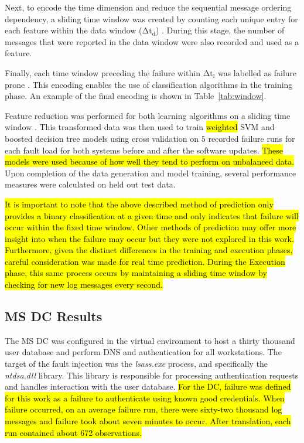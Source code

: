 Next, to encode the time dimension and reduce the sequential message ordering
dependency, a sliding time window was created by counting each unique entry for
each feature within the data window ($\mathrm{\Delta t_d}$)
\citep{vaarandi2002}.  During this stage, the number of messages that were
reported in the data window were also recorded and used as a feature.

Finally, each time window preceding the failure within $\mathrm{\Delta t_l}$
was labelled as failure prone \citep{irrera2015}.  This encoding enables the
use of classification algorithms in the training phase.  An example of the
final encoding is shown in Table~\ref{tab:window}.

\tabMessageIDs %
\tabSlidingWindow

Feature reduction was performed for both learning algorithms on a sliding time
window \citep{fulp2008,irrera2013a,vaarandi2002}.  This transformed data was
then used to train \hl{weighted} \ac{SVM} and boosted decision tree models
using cross validation on $5$ recorded failure runs for each fault load for
both systems before and after the software updates.  \hl{These models were used
because of how well they tend to perform on unbalanced data.} Upon completion
of the data generation and model training, several performance measures were
calculated on held out test data.

\hl{It is important to note that the above described method of prediction only
provides a binary classification at a given time and only indicates that
failure will occur within the fixed time window.  Other methods of prediction
may offer more insight into when the failure may occur but they were not
explored in this work.  Furthermore, given the distinct differences in the
training and execution phases, careful consideration was made for real time
prediction.  During the Execution phase, this same process occurs by
maintaining a sliding time window by checking for new log messages every
second.}

\subsection{\acrfull{MS} \acrfull{DC} Results}
The \ac{MS} \ac{DC} was configured in the virtual environment to host a
thirty thousand user database and perform \ac{DNS} and authentication for all
workstations.  The target of the fault injection was the \emph{lsass.exe}
process, and specifically the \emph{ntdsa.dll} library.  This library is
responsible for processing authentication requests and handles interaction with
the user database.  \hl{For the \ac{DC}, failure was defined for this work as a
failure to authenticate using known good credentials.  When failure occurred,
on an average failure run, there were sixty-two thousand log messages and
failure took about seven minutes to occur.  After translation, each run
contained about 672 observations.} 


